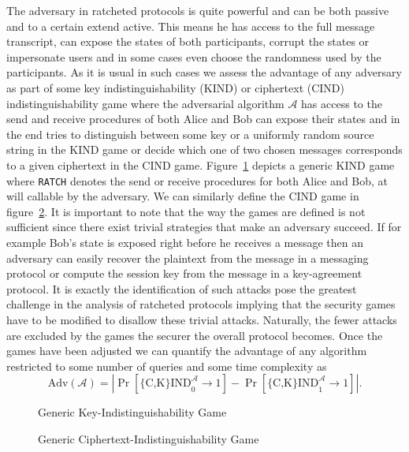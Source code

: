 \documentclass[11pt,a4paper,twoside,openright,bibliography=totoc]{scrbook}
\renewcommand{\t}{\text} %
\begin{document}
The adversary in ratcheted protocols is quite powerful and can be both
passive and to a certain extend active. This means he has access to
the full message transcript, can expose the states of both
participants, corrupt the states or impersonate users and in some
cases even choose the randomness used by the participants. As it is
usual in such cases we assess the advantage of any adversary as part
of some key indistinguishability (KIND) or ciphertext (CIND)
indistinguishability game where the adversarial algorithm $\mathcal{A}$
has access to the send and receive procedures of both Alice and Bob can expose their states
and in the end tries to distinguish between some key or a uniformly
random source string in the KIND
game or decide which one of two chosen messages corresponds to a given
ciphertext in the CIND game.
Figure~\ref{fig:kind} depicts a generic KIND game where \texttt{RATCH} denotes
the send or receive procedures for both Alice and Bob, at will callable by the
adversary. We can similarly define the CIND game in figure~\ref{fig:cind}.
It is important to note that the way the games are defined is
not sufficient since there exist trivial strategies that make an adversary
succeed. If for example Bob's state is exposed right before he
receives a message then an adversary can easily recover the plaintext
from the message in a messaging protocol or compute the session key
from the message in a key-agreement protocol. It is exactly the
identification of such attacks pose the greatest
challenge in the analysis of ratcheted protocols implying that the security games
have to be modified to disallow these trivial attacks. Naturally,
the fewer attacks are excluded by the games the securer the overall
protocol becomes. Once the games have been adjusted we can
quantify the advantage of any algorithm restricted to some number of queries
and some time complexity as
\[
  \t{Adv}(\mathcal{A}) = \left| \Pr \left[ \t{\{C,K\}IND}_0^\mathcal{A} \rightarrow 1 \right] -
                                \Pr \left[ \t{\{C,K\}IND}_1^\mathcal{A} \rightarrow 1 \right]
                         \right|.
\]

\begin{figure}[ht]
  \centering
  \setlength{\fboxsep}{10pt}
  \scalebox{0.9}{%
    \fbox{%
      
    }
  }
  \caption{Generic Key-Indistinguishability Game}
  \label{fig:kind}
\end{figure}

\begin{figure}[ht]
  \centering
  \setlength{\fboxsep}{10pt}
  \scalebox{0.9}{%
    \fbox{%
      
    }
  }
  \caption{Generic Ciphertext-Indistinguishability Game}
  \label{fig:cind}
\end{figure}
\end{document}
